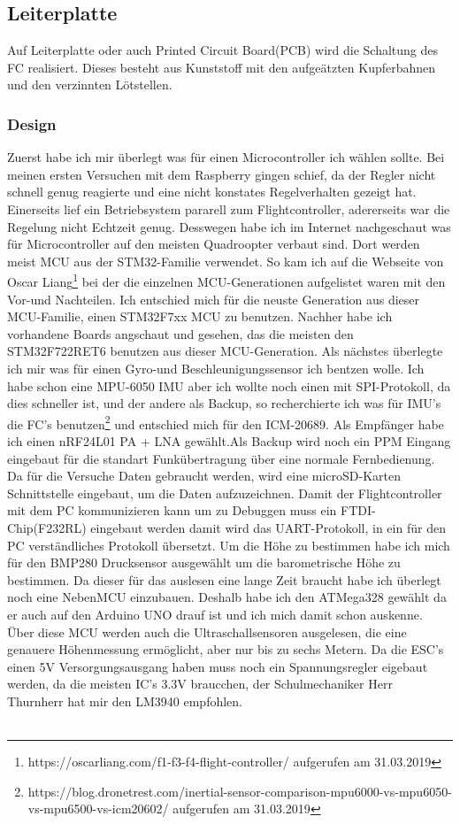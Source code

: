 \documentclass[12pt,a4paper, ngerman]{article}
\begin{document}
\subsection{Leiterplatte}
Auf Leiterplatte oder auch Printed Circuit Board(PCB) wird die Schaltung des FC realisiert. Dieses besteht aus Kunststoff mit den aufgeätzten Kupferbahnen und den verzinnten Lötstellen.
\subsubsection{Design}
Zuerst habe ich mir überlegt was für einen Microcontroller ich wählen sollte. Bei meinen ersten Versuchen mit dem Raspberry gingen schief, da der Regler nicht schnell genug reagierte und eine nicht konstates Regelverhalten gezeigt hat. Einerseits lief ein Betriebsystem pararell zum Flightcontroller, adererseits war die Regelung nicht Echtzeit genug. Desswegen habe ich im Internet nachgeschaut was für Microcontroller auf den meisten Quadroopter verbaut sind. Dort werden  meist MCU aus der STM32-Familie verwendet. So kam ich auf die Webseite von Oscar Liang\footnote{\label{foot:1}https://oscarliang.com/f1-f3-f4-flight-controller/ aufgerufen am 31.03.2019} bei der die einzelnen MCU-Generationen aufgelistet waren mit den Vor-und Nachteilen. Ich entschied mich für die neuste Generation aus dieser MCU-Familie, einen STM32F7xx MCU zu benutzen. Nachher habe ich vorhandene Boards angschaut und gesehen, das die meisten den STM32F722RET6 benutzen aus dieser MCU-Generation. Als nächstes überlegte ich mir was für einen Gyro-und Beschleunigungssensor ich bentzen wolle. Ich habe schon eine MPU-6050 IMU aber ich wollte noch einen mit SPI-Protokoll, da dies schneller ist, und der andere als Backup, so recherchierte ich was für IMU's die FC's benutzen\footnote{\label{foot:2}https://blog.dronetrest.com/inertial-sensor-comparison-mpu6000-vs-mpu6050-vs-mpu6500-vs-icm20602/ aufgerufen am 31.03.2019} und entschied mich für den ICM-20689. Als Empfänger habe ich einen nRF24L01 PA + LNA gewählt.Als Backup wird noch ein PPM Eingang eingebaut für die standart Funkübertragung über eine normale Fernbedienung. Da für die Versuche Daten gebraucht werden, wird eine microSD-Karten Schnittstelle eingebaut, um die Daten aufzuzeichnen. Damit der Flightcontroller mit dem PC kommunizieren kann um zu Debuggen muss ein FTDI-Chip(F232RL) eingebaut werden damit wird das UART-Protokoll, in ein für den PC verständliches Protokoll übersetzt. Um die Höhe zu bestimmen habe ich mich für den BMP280 Drucksensor ausgewählt um die barometrische Höhe zu bestimmen. Da dieser für das auslesen eine lange Zeit braucht habe ich überlegt noch eine NebenMCU einzubauen. Deshalb habe ich den ATMega328 gewählt da er auch auf den Arduino UNO drauf ist und ich mich damit schon auskenne. Über diese MCU werden auch die Ultraschallsensoren ausgelesen, die eine genauere Höhenmessung ermöglicht, aber nur bis zu sechs Metern. Da die ESC's einen 5V Versorgungsausgang haben muss noch ein Spannungsregler  eigebaut werden, da die meisten IC's 3.3V braucchen, der Schulmechaniker Herr Thurnherr hat mir den LM3940 empfohlen.\\ \\
\end{document}
